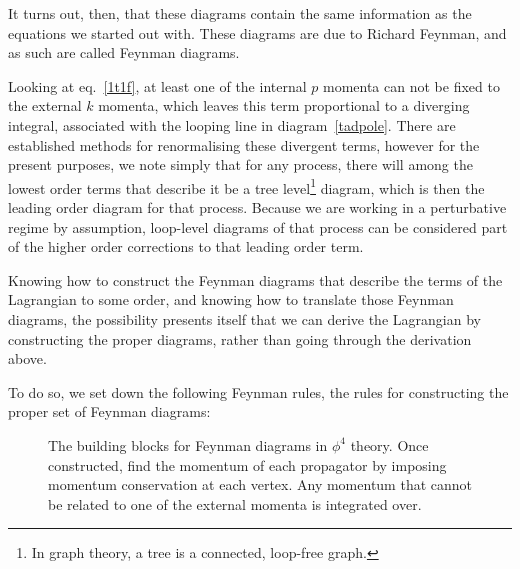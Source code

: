 It turns out, then, that these diagrams contain the same information as the equations we started out with. These diagrams are due to Richard Feynman, and as such are called Feynman diagrams.

Looking at eq.~\eqref{1t1f}, at least one of the internal $p$ momenta can not be fixed to the external $k$ momenta, which leaves this term proportional to a diverging integral, associated with the looping line in diagram~\eqref{tadpole}. There are established methods for renormalising these divergent terms, however for the present purposes, we note simply that for any process, there will among the lowest order terms that describe it be a tree level\footnote{In graph theory, a tree is a connected, loop-free graph.} diagram, which is then the leading order diagram for that process. Because we are working in a perturbative regime by assumption, loop-level diagrams of that process can be considered part of the higher order corrections to that leading order term.

Knowing how to construct the Feynman diagrams that describe the terms of the Lagrangian to some order, and knowing how to translate those Feynman diagrams, the possibility presents itself that we can derive the Lagrangian by constructing the proper diagrams, rather than going through the derivation above.

To do so, we set down the following Feynman rules, the rules for constructing the proper set of Feynman diagrams:

\begin{figure}[htb]
\hfill
{}
\hspace{5ex}
\hfill \phantom{d}
\caption{The building blocks for Feynman diagrams in $\phi^4$ theory. Once constructed, find the momentum of each propagator by imposing momentum conservation at each vertex. Any momentum that cannot be related to one of the external momenta is integrated over.
\label{phi4rules}}
\end{figure}


